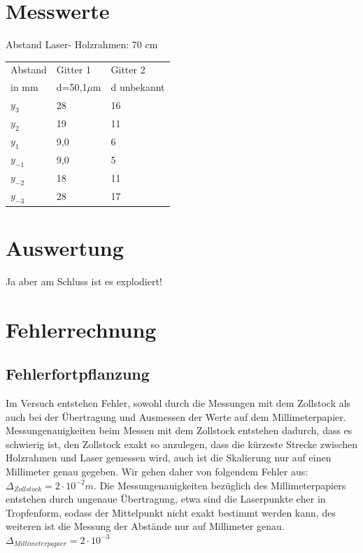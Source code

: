 \documentclass[12pt,a4paper,titlepage,headinclude,bibtotoc]{scrartcl}
\begin{document}
\section{Messwerte}


Abstand Laser- Holzrahmen: 70 cm


\begin{table} [h]
\centering
\begin{large}

\end{large}
\begin{tabular}{|p{4 cm}||p{4 cm}|p{4 cm}|}
        \hline
          Abstand  & Gitter 1  & Gitter 2 \\
          in mm & d=50,1$\mu$m & d unbekannt\\
         
         
         \hline 
         $y_3 $& 28 & 16 \\
         \hline
         $y_2 $& 19 & 11\\
         \hline
         $y_{1} $& 9,0 & 6 \\
         \hline
         $y_{-1}$& 9,0 & 5 \\
         \hline
         $y_{-2}$& 18 & 11 \\
         \hline             
         $y_{-3}$& 28 & 17 \\
         \hline
\end{tabular}
\end{table}



\section{Auswertung}

Ja aber am Schluss ist es explodiert!

\section{Fehlerrechnung}
\subsection{Fehlerfortpflanzung}
Im Versuch entstehen Fehler, sowohl durch die Messungen mit dem Zollstock als auch bei der Übertragung und Ausmessen der Werte auf dem Millimeterpapier. Messungenauigkeiten beim Messen mit dem Zollstock entstehen dadurch, dass es schwierig ist, den Zollstock exakt so anzulegen, dass die kürzeste Strecke zwischen Holzrahmen und Laser gemessen wird, auch ist die Skalierung nur auf einen Millimeter genau gegeben. Wir gehen daher von folgendem Fehler aus: $\Delta_{Zollstock}={2} \cdot{10^{-2}}m$. Die Messungenauigkeiten bezüglich des Millimeterpapiers entstehen durch ungenaue Übertragung, etwa sind die Laserpunkte eher in Tropfenform, sodass der Mittelpunkt nicht exakt bestimmt werden kann, des weiteren ist die Messung der Abstände nur auf Millimeter genau. $\Delta_{Millimeterpapier}={2} \cdot {10^{-3}}$
\end{document}
